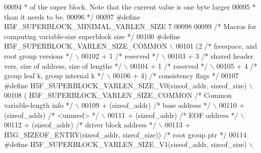 \begin{DoxyCode}
00094 \textcolor{comment}{ * of the super block.  Note that the current value is one byte larger}
00095 \textcolor{comment}{ * than it needs to be. }
00096 \textcolor{comment}{ */}
00097 \textcolor{preprocessor}{#define H5F\_SUPERBLOCK\_MINIMAL\_VARLEN\_SIZE  7}
00098 
00099 \textcolor{comment}{/* Macros for computing variable-size superblock size */}
00100 \textcolor{preprocessor}{#define H5F\_SUPERBLOCK\_VARLEN\_SIZE\_COMMON                               \(\backslash\)}
00101 \textcolor{preprocessor}{        (2  }\textcolor{comment}{/* freespace, and root group versions */}\textcolor{preprocessor}{            \(\backslash\)}
00102 \textcolor{preprocessor}{        + 1 }\textcolor{comment}{/* reserved */}\textcolor{preprocessor}{                                              \(\backslash\)}
00103 \textcolor{preprocessor}{        + 3 }\textcolor{comment}{/* shared header vers, size of address, size of lengths */}\textcolor{preprocessor}{  \(\backslash\)}
00104 \textcolor{preprocessor}{        + 1 }\textcolor{comment}{/* reserved */}\textcolor{preprocessor}{                                              \(\backslash\)}
00105 \textcolor{preprocessor}{        + 4 }\textcolor{comment}{/* group leaf k, group internal k */}\textcolor{preprocessor}{                        \(\backslash\)}
00106 \textcolor{preprocessor}{        + 4) }\textcolor{comment}{/* consistency flags */}\textcolor{preprocessor}{}
00107 \textcolor{preprocessor}{#define H5F\_SUPERBLOCK\_VARLEN\_SIZE\_V0(sizeof\_addr, sizeof\_size)         \(\backslash\)}
00108 \textcolor{preprocessor}{        ( H5F\_SUPERBLOCK\_VARLEN\_SIZE\_COMMON }\textcolor{comment}{/* Common variable-length info */}\textcolor{preprocessor}{ \(\backslash\)}
00109 \textcolor{preprocessor}{        + (sizeof\_addr) }\textcolor{comment}{/* base address */}\textcolor{preprocessor}{                              \(\backslash\)}
00110 \textcolor{preprocessor}{        + (sizeof\_addr) }\textcolor{comment}{/* <unused> */}\textcolor{preprocessor}{                                  \(\backslash\)}
00111 \textcolor{preprocessor}{        + (sizeof\_addr) }\textcolor{comment}{/* EOF address */}\textcolor{preprocessor}{                               \(\backslash\)}
00112 \textcolor{preprocessor}{        + (sizeof\_addr) }\textcolor{comment}{/* driver block address */}\textcolor{preprocessor}{                      \(\backslash\)}
00113 \textcolor{preprocessor}{        + H5G\_SIZEOF\_ENTRY(sizeof\_addr, sizeof\_size)) }\textcolor{comment}{/* root group ptr */}\textcolor{preprocessor}{}
00114 \textcolor{preprocessor}{#define H5F\_SUPERBLOCK\_VARLEN\_SIZE\_V1(sizeof\_addr, sizeof\_size)         \(\backslash\)}

\end{DoxyCode}
